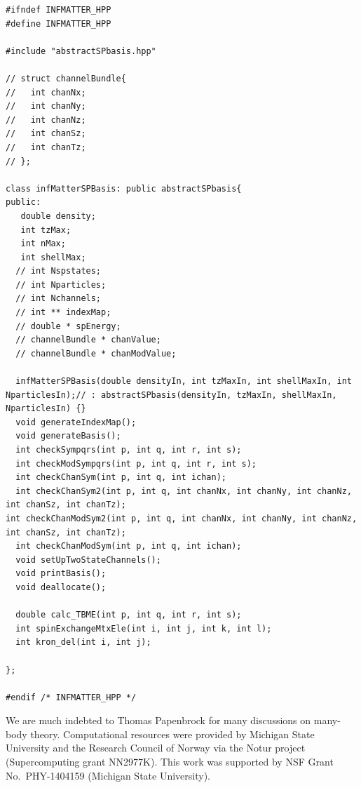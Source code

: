 \begin{lstlisting}
#ifndef INFMATTER_HPP
#define INFMATTER_HPP

#include "abstractSPbasis.hpp"

// struct channelBundle{
//   int chanNx;
//   int chanNy;
//   int chanNz;
//   int chanSz;
//   int chanTz; 
// };

class infMatterSPBasis: public abstractSPbasis{
public:
   double density;
   int tzMax;
   int nMax;
   int shellMax;
  // int Nspstates;
  // int Nparticles;
  // int Nchannels;
  // int ** indexMap;
  // double * spEnergy;
  // channelBundle * chanValue;
  // channelBundle * chanModValue;

  infMatterSPBasis(double densityIn, int tzMaxIn, int shellMaxIn, int NparticlesIn);// : abstractSPbasis(densityIn, tzMaxIn, shellMaxIn, NparticlesIn) {}
  void generateIndexMap();
  void generateBasis();
  int checkSympqrs(int p, int q, int r, int s);
  int checkModSympqrs(int p, int q, int r, int s);
  int checkChanSym(int p, int q, int ichan);
  int checkChanSym2(int p, int q, int chanNx, int chanNy, int chanNz, int chanSz, int chanTz);
int checkChanModSym2(int p, int q, int chanNx, int chanNy, int chanNz, int chanSz, int chanTz);
  int checkChanModSym(int p, int q, int ichan);  
  void setUpTwoStateChannels();
  void printBasis();
  void deallocate();

  double calc_TBME(int p, int q, int r, int s);
  int spinExchangeMtxEle(int i, int j, int k, int l);
  int kron_del(int i, int j);

};

#endif /* INFMATTER_HPP */
\end{lstlisting}

  \begin{acknowledgement}
  We are much indebted to Thomas Papenbrock for many discussions on
  many-body theory.  Computational resources were provided by
  Michigan State University and the Research Council of Norway via the
  Notur project (Supercomputing grant NN2977K).  This work was
  supported by NSF Grant No.~PHY-1404159 (Michigan State University).
  \end{acknowledgement}



 




